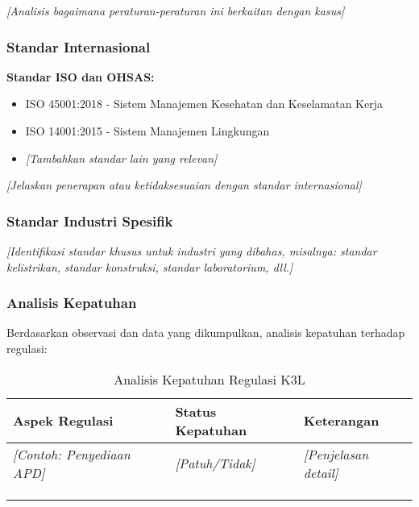 \textit{[Analisis bagaimana peraturan-peraturan ini berkaitan dengan kasus]}

\vspace{0.5cm}

\subsubsection{Standar Internasional}

\textbf{Standar ISO dan OHSAS:}
\begin{itemize}
    \item ISO 45001:2018 - Sistem Manajemen Kesehatan dan Keselamatan Kerja
    \item ISO 14001:2015 - Sistem Manajemen Lingkungan
    \item \textit{[Tambahkan standar lain yang relevan]}
\end{itemize}

\textit{[Jelaskan penerapan atau ketidaksesuaian dengan standar internasional]}

\vspace{0.5cm}

\subsubsection{Standar Industri Spesifik}

\textit{[Identifikasi standar khusus untuk industri yang dibahas, misalnya: standar kelistrikan, standar konstruksi, standar laboratorium, dll.]}

\vspace{0.5cm}

\subsubsection{Analisis Kepatuhan}

Berdasarkan observasi dan data yang dikumpulkan, analisis kepatuhan terhadap regulasi:

\begin{table}[h]
\centering
\begin{tabular}{|p{5cm}|p{3cm}|p{6cm}|}
\hline
\textbf{Aspek Regulasi} & \textbf{Status Kepatuhan} & \textbf{Keterangan} \\
\hline
\textit{[Contoh: Penyediaan APD]} & \textit{[Patuh/Tidak]} & \textit{[Penjelasan detail]} \\
\hline
 & & \\
\hline
 & & \\
\hline
 & & \\
\hline
\end{tabular}
\caption{Analisis Kepatuhan Regulasi K3L}
\label{tab:kepatuhan-regulasi}
\end{table}

